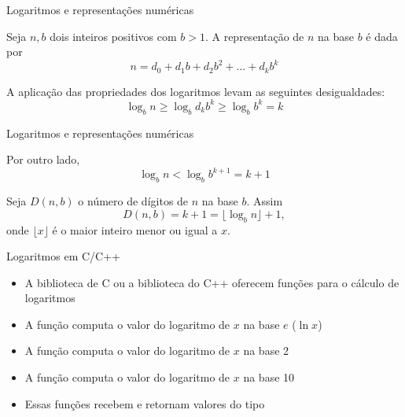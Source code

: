 \begin{frame}[fragile]{Logaritmos e representações numéricas}

    Seja $n, b$ dois inteiros positivos com $b > 1$. A representação de $n$ na base $b$ é dada por
    $$
        n = d_0 + d_1b + d_2b^2 + \ldots + d_kb^k
    $$

    \vspace{0.2in}

    A aplicação das propriedades dos logaritmos levam as seguintes desigualdades:
    $$
        \log_b n \geq \log_b d_kb^k \geq \log_b b^k = k
    $$
\end{frame}

\begin{frame}[fragile]{Logaritmos e representações numéricas}

    Por outro lado,
    $$
    \log_b n < \log_b b^{k + 1} = k + 1
    $$

    \vspace{0.2in}

    Seja $D(n, b)$ o número de dígitos de $n$ na base $b$. Assim
    $$
        D(n, b) = k + 1 = \lfloor \log_b n\rfloor + 1,
    $$
    onde $\lfloor x \rfloor$ é o maior inteiro menor ou igual a $x$.
\end{frame}

\begin{frame}[fragile]{Logaritmos em C/C++}

    \begin{itemize}
        \item A biblioteca  de C ou a biblioteca  do C++ oferecem funções para o cálculo de logaritmos
        \item A função  computa o valor do logaritmo de $x$ na base $e$ ($\ln x$)
        \item A função  computa o valor do logaritmo de $x$ na base 2
        \item A função  computa o valor do logaritmo de $x$ na base 10
        \item Essas funções recebem e retornam valores do tipo 
    \end{itemize}

\end{frame}
